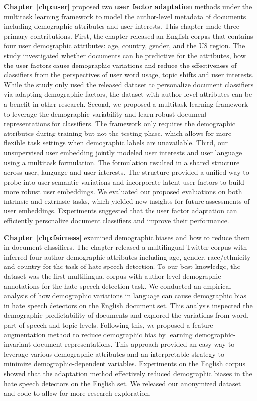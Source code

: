 \textbf{Chapter~\ref{chp:user}} proposed two \textbf{user factor adaptation} methods under the multitask learning framework to model the author-level metadata of documents including demographic attributes and user interests.
This chapter made three primary contributions. 
First, the chapter released an English corpus that contains four user demographic attributes: age, country, gender, and the US region. 
The study investigated whether documents can be predictive for the attributes, how the user factors cause demographic variations and reduce the effectiveness of classifiers from the perspectives of user word usage, topic shifts and user interests.
While the study only used the released dataset to personalize document classifiers via adapting demographic factors, the dataset with author-level attributes can be a benefit in other research.
Second, we proposed a multitask learning framework to leverage the demographic variability and learn robust document representations for classifiers. 
The framework only requires the demographic attributes during training but not the testing phase, which allows for more flexible task settings when demographic labels are unavailable. 
Third, our unsupervised user embedding jointly modeled user interests and user language using a multitask formulation.
The formulation resulted in a shared structure across user, language and user interests.
The structure provided a unified way to probe into user semantic variations and incorporate latent user factors to build more robust user embeddings. 
We evaluated our proposed evaluations on both intrinsic and extrinsic tasks, which yielded new insights for future assessments of user embeddings. 
Experiments suggested that the user factor adaptation can efficiently personalize document classifiers and improve their performance.

\textbf{Chapter~\ref{chp:fairness}} examined demographic biases and how to reduce them in document classifiers. 
The chapter released a multilingual Twitter corpus with inferred four author demographic attributes including age, gender, race/ethnicity and country for the task of hate speech detection.
To our best knowledge, the dataset was the first multilingual corpus with author-level demographic annotations for the hate speech detection task. 
We conducted an empirical analysis of how demographic variations in language can cause demographic bias in hate speech detectors on the English document set.
This analysis inspected the demographic predictability of documents and explored the variations from word, part-of-speech and topic levels.
Following this, we proposed a feature augmentation method to reduce demographic bias by learning demographic-invariant document representations.
This approach provided an easy way to leverage various demographic attributes and an interpretable strategy to minimize demographic-dependent variables. 
Experiments on the English corpus showed that the adaptation method effectively reduced demographic biases in the hate speech detectors on the English set. We released our anonymized dataset and code to allow for more research exploration.


